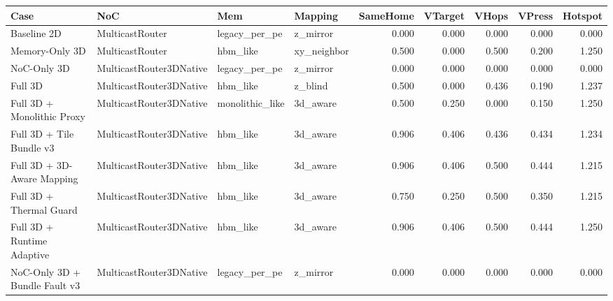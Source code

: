 \begin{tabular}{l l l l r r r r r}
\hline
Case & NoC & Mem & Mapping & SameHome & VTarget & VHops & VPress & Hotspot \\
\hline
Baseline 2D & MulticastRouter & legacy\_per\_pe & z\_mirror & 0.000 & 0.000 & 0.000 & 0.000 & 0.000 \\
Memory-Only 3D & MulticastRouter & hbm\_like & xy\_neighbor & 0.500 & 0.000 & 0.500 & 0.200 & 1.250 \\
NoC-Only 3D & MulticastRouter3DNative & legacy\_per\_pe & z\_mirror & 0.000 & 0.000 & 0.000 & 0.000 & 0.000 \\
Full 3D & MulticastRouter3DNative & hbm\_like & z\_blind & 0.500 & 0.000 & 0.436 & 0.190 & 1.237 \\
Full 3D + Monolithic Proxy & MulticastRouter3DNative & monolithic\_like & 3d\_aware & 0.500 & 0.250 & 0.000 & 0.150 & 1.250 \\
Full 3D + Tile Bundle v3 & MulticastRouter3DNative & hbm\_like & 3d\_aware & 0.906 & 0.406 & 0.436 & 0.434 & 1.234 \\
Full 3D + 3D-Aware Mapping & MulticastRouter3DNative & hbm\_like & 3d\_aware & 0.906 & 0.406 & 0.500 & 0.444 & 1.215 \\
Full 3D + Thermal Guard & MulticastRouter3DNative & hbm\_like & 3d\_aware & 0.750 & 0.250 & 0.500 & 0.350 & 1.215 \\
Full 3D + Runtime Adaptive & MulticastRouter3DNative & hbm\_like & 3d\_aware & 0.906 & 0.406 & 0.500 & 0.444 & 1.250 \\
NoC-Only 3D + Bundle Fault v3 & MulticastRouter3DNative & legacy\_per\_pe & z\_mirror & 0.000 & 0.000 & 0.000 & 0.000 & 0.000 \\
\hline
\end{tabular}
